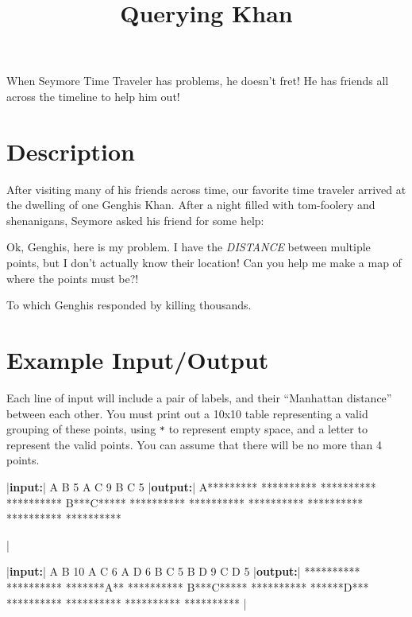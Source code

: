 \documentclass{../codeproblem}
\begin{document}
\title{Querying Khan}


\begin{flavor}
  When Seymore Time Traveler has problems, he doesn't fret! He has
  friends all across the timeline to help him out!
\end{flavor}

\section*{Description}

After visiting many of his friends across time, our favorite time
traveler arrived at the dwelling of one Genghis Khan. After a night
filled with tom-foolery and shenanigans, Seymore asked his friend for
some help:
\begin{flavor}
  Ok, Genghis, here is my problem. I have the \emph{DISTANCE} between
  multiple points, but I don't actually know their location! Can you
  help me make a map of where the points must be?!
\end{flavor}
To which Genghis responded by killing thousands.

\section*{Example Input/Output}
Each line of input will include a pair of labels, and their
``Manhattan distance'' between each other. You must print out a 10x10
table representing a valid grouping of these points,
using \texttt{*} to represent empty space, and a letter to
represent the valid points. You can assume that there will be no more
than 4 points.

\begin{minipage}{.5\linewidth}
  \begin{example}
|\textbf{input:}|
A B 5
A C 9
B C 5
|\textbf{output:}|
A*********
**********
**********
**********
B***C*****
**********
**********
**********
**********
**********
**********



|\end{example}
\end{minipage}
\begin{minipage}{.5\linewidth}
\begin{example}
|\textbf{input:}|
A B 10 
A C 6
A D 6
B C 5
B D 9
C D 5
|\textbf{output:}|
**********
**********
*******A**
**********
B***C*****
**********
******D***
**********
**********
**********
**********
|\end{example}
\end{minipage}
\end{document}
